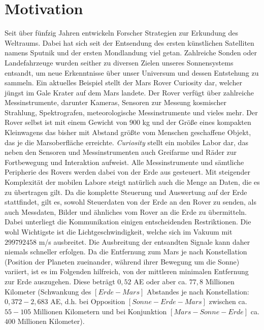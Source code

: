 \section{Motivation}

Seit {\"u}ber f{\"u}nfzig Jahren entwickeln Forscher Strategien
zur Erkundung des Weltraums. Dabei hat sich seit der Entsendung des ersten k{\"u}nstlichen
Satelliten namens Sputnik und der ersten Mondlandung viel getan.
Zahlreiche Sonden oder Landefahrzeuge wurden seither zu diversen Zielen unseres
Sonnensystems entsandt, um neue Erkenntnisse {\"u}ber unser Universum und dessen
Entstehung zu sammeln. Ein aktuelles Beispiel stellt der Mars Rover Curiosity
dar, welcher j{\"u}ngst im Gale Krater auf dem Mars landete. Der Rover
verf{\"u}gt {\"u}ber zahlreiche Messinstrumente, darunter Kameras, Sensoren zur
Messung kosmischer Strahlung, Spektrografen, meteorologische Messinstrumente und
vieles mehr. Der Rover selbst ist mit einem Gewicht von $900$ kg und der
Gr{\"o}{\ss}e eines kompakten Kleinwagens das bisher mit Abstand gr{\"o}{\ss}te
vom Menschen geschaffene Objekt, das je die Marsoberfl{\"a}che erreichte.
\textit{Curiosity} stellt ein mobiles Labor dar, das neben den Sensoren und
Messinstrumenten auch Greifarme und R{\"a}der zur Fortbewegung und Interaktion
aufweist. Alle Messinstrumente und s{\"a}mtliche Peripherie des Rovers werden dabei von der
Erde aus gesteuert. \newline
Mit steigender Komplexit{\"a}t der mobilen Labore
steigt nat{\"u}rlich auch die Menge an Daten, die es zu {\"u}bertragen gilt. Da
die komplette Steuerung und Auswertung auf der Erde stattfindet, gilt es, sowohl
Steuerdaten von der Erde an den Rover zu senden, als auch Messdaten, Bilder und
{\"a}hnliches vom Rover an die Erde zu {\"u}bermitteln. Dabei unterliegt die
Kommunikation einigen entscheidenden Restriktionen. Die wohl Wichtigste ist die
Lichtgeschwindigkeit, welche sich im Vakuum mit $299 792 458$ m/s ausbreitet.
Die Ausbreitung der entsandten Signale kann daher niemals schneller erfolgen. Da die
Entfernung zum Mars je nach Konstellation (Position der Planeten zueinander,
w{\"a}hrend ihrer Bewegung um die Sonne) variiert, ist es im Folgenden
hilfreich, von der mittleren minimalen Entfernung zur Erde auszugehen. Diese
betr{\"a}gt $0,52$ AE oder aber ca. $77,8$ Millionen Kilometer (Schwankung des
$[Erde - Mars]$ Abstandes je nach Konstellation: $0,372 - 2,683$ AE, d.h. bei
Opposition $[Sonne - Erde - Mars]$ zwischen ca. $55 - 105$ Millionen Kilometern
und bei Konjunktion $[Mars - Sonne - Erde]$ ca. $400$ Millionen Kilometer).
